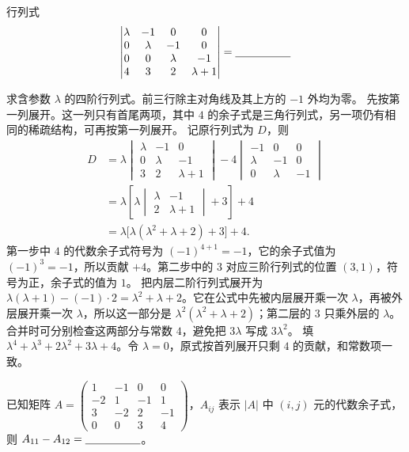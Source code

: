 \documentclass[UTF8,zihao=-4,fontset=fandol]{ctexart}
\begin{document}
行列式
\[
\begin{vmatrix}
\lambda&-1&0&0\\
0&\lambda&-1&0\\
0&0&\lambda&-1\\
4&3&2&\lambda+1
\end{vmatrix}
=\underline{\hspace{5em}}
\]

\Solution
\Known 求含参数 $\lambda$ 的四阶行列式。前三行除主对角线及其上方的 $-1$ 外均为零。
\Method 先按第一列展开。这一列只有首尾两项，其中 $4$ 的余子式是三角行列式，另一项仍有相同的稀疏结构，可再按第一列展开。
\Derive 记原行列式为 $D$，则
\[
\begin{aligned}
D&=\lambda\begin{vmatrix}\lambda&-1&0\\0&\lambda&-1\\3&2&\lambda+1\end{vmatrix}
 -4\begin{vmatrix}-1&0&0\\\lambda&-1&0\\0&\lambda&-1\end{vmatrix}\\
 &=\lambda\left[\lambda
 \begin{vmatrix}\lambda&-1\\2&\lambda+1\end{vmatrix}+3\right]+4\\
 &=\lambda\bigl[\lambda(\lambda^2+\lambda+2)+3\bigr]+4.
\end{aligned}
\]
第一步中 $4$ 的代数余子式符号为 $(-1)^{4+1}=-1$，它的余子式值为 $(-1)^3=-1$，所以贡献 $+4$。第二步中的 $3$ 对应三阶行列式的位置 $(3,1)$，符号为正，余子式的值为 $1$。
把内层二阶行列式展开为 $\lambda(\lambda+1)-(-1)\cdot2=\lambda^2+\lambda+2$。它在公式中先被内层展开乘一次 $\lambda$，再被外层展开乘一次 $\lambda$，所以这一部分是 $\lambda^2(\lambda^2+\lambda+2)$；第二层的 $3$ 只乘外层的 $\lambda$。合并时可分别检查这两部分与常数 $4$，避免把 $3\lambda$ 写成 $3\lambda^2$。
\Verify 填 $\boxed{\lambda^4+\lambda^3+2\lambda^2+3\lambda+4}$。令 $\lambda=0$，原式按首列展开只剩 $4$ 的贡献，和常数项一致。

已知矩阵 $A=\begin{pmatrix}1&-1&0&0\\-2&1&-1&1\\3&-2&2&-1\\0&0&3&4\end{pmatrix}$，$A_{ij}$ 表示 $|A|$ 中 $(i,j)$ 元的代数余子式，则 $A_{11}-A_{12}=\underline{\hspace{5em}}$。
\end{document}
